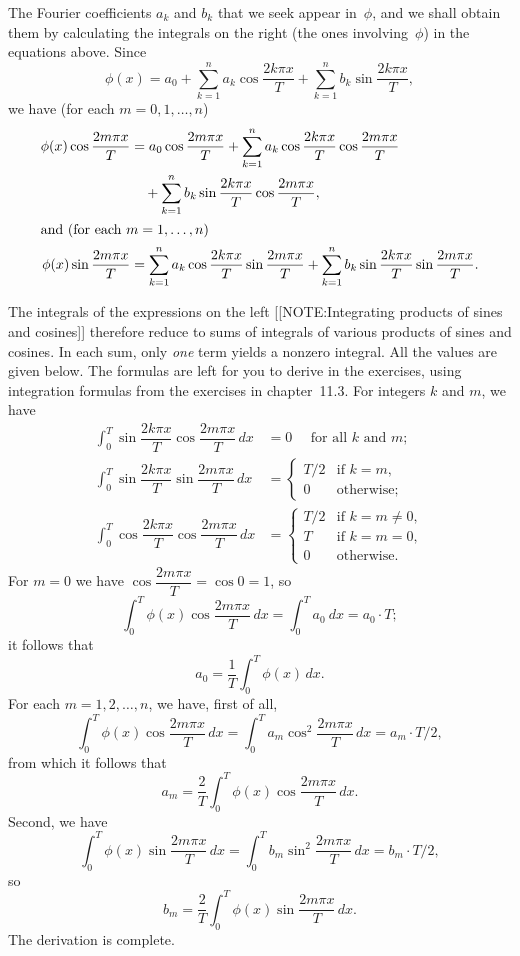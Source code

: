 The Fourier coefficients $a_k$ and $b_k$ that we seek appear
in~$\phi$, and we shall obtain them by calculating the integrals on
the right (the ones involving~$\phi$) in the equations above.  Since 
\[
\phi(x) = a_0 + \sum_{k=1}^n a_k \cos\dfrac{2k\pi x}{T} 
     + \sum_{k=1}^n b_k \sin\dfrac{2k\pi x}{T},
\]
we have (for each $m = 0, 1, \ldots , n$)
\begin{align*}
\phi(x)\cos\dfrac{2m\pi x}{T}  
   &= a_0 \cos\dfrac{2m\pi x}{T}  
     + \sum_{k=1}^n a_k \cos\dfrac{2k\pi x}{T} \cos\dfrac{2m\pi x}{T} \\  
   &\mbox{}\quad 
     + \sum_{k=1}^n b_k \sin\dfrac{2k\pi x}{T} \cos\dfrac{2m\pi x}{T},  \\
\intertext{and (for each $m = 1, \ldots , n$)}
\phi(x)\sin\dfrac{2m\pi x}{T}  
   &= 
      \sum_{k=1}^n a_k \cos\dfrac{2k\pi x}{T} \sin\dfrac{2m\pi x}{T}
     + \sum_{k=1}^n b_k \sin\dfrac{2k\pi x}{T} \sin\dfrac{2m\pi x}{T}.  
\end{align*}


The integrals of the expressions on the left 
[[NOTE:Integrating products  of sines and cosines]]
therefore reduce to sums of integrals of various products of sines and
cosines.  In each sum, only \emph{one} term yields a nonzero integral.
All the values are given below.  The formulas are left for you to derive
in the exercises, using integration formulas from the exercises in
chapter~11.3.  For integers $k$ and $m$, we have
\begin{align*}
\int_0^T \sin\dfrac{2k\pi x}{T} \cos\dfrac{2m\pi x}{T} \, dx 
  &=  0 \quad \mbox{ for all $k$ and $m$}; 
  \\[6pt]
\int_0^T \sin\dfrac{2k\pi x}{T} \sin\dfrac{2m\pi x}{T} \, dx 
  &= \begin{cases}
	T/2 & \text{if $k=m$}, \\
	0   & \text{otherwise};
     \end{cases}
 \\[8pt]
\int_0^T \cos\dfrac{2k\pi x}{T} \cos\dfrac{2m\pi x}{T} \, dx 
  &= \begin{cases}
	T/2  & \text{if $k=m \ne 0$}, \\
	T & \text{if $k=m=0$}, \\
	0    & \text{otherwise}.
     \end{cases}
\end{align*}
For $m = 0$ we have $\cos\dfrac{2m\pi x}{T} = \cos{0} = 1$, so
\[
\int_0^T \phi(x)\cos\dfrac{2m\pi x}{T} \, dx
   = \int_0^T a_0  \ dx
   = a_0 \cdot T;
\]
it follows that 
\[
a_0 = \dfrac{1}{T} \int_0^T \phi(x) \, dx.
\]
For each $m = 1, 2, \ldots , n$, we have, first of all,
\[
\int_0^T \phi(x)\cos\dfrac{2m\pi x}{T} \, dx 
   = \int_0^T a_m \cos^2\dfrac{2m\pi x}{T} \, dx 
   = a_m \cdot T/2,
\]
from which it follows that
\[
a_m = \dfrac{2}{T} \int_0^T \phi(x)\cos\dfrac{2m\pi x}{T} \, dx.
\]
Second, we have
\[
\int_0^T \phi(x)\sin\dfrac{2m\pi x}{T} \, dx 
   = \int_0^T b_m \sin^2\dfrac{2m\pi x}{T} \, dx 
   = b_m \cdot T/2,
\]
so
\[
b_m = \dfrac{2}{T} \int_0^T \phi(x)\sin\dfrac{2m\pi x}{T} \, dx.
\]
The derivation is complete.

